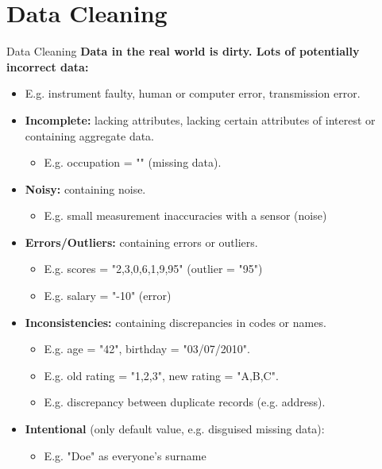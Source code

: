 \section{Data Cleaning}

\begin{frame}{Data Cleaning}
	\textbf{Data in the real world is {\color{airforceblue}dirty}. Lots of
		potentially incorrect data:}
	\begin{itemize}
		\item E.g. instrument faulty, human or computer error, transmission
		      error.
		\item \textbf{\color{airforceblue}Incomplete:} lacking attributes,
		      lacking certain attributes of interest or containing aggregate data.
		      \begin{itemize}
			      \item E.g. occupation = "" (missing data).
		      \end{itemize}
		\item \textbf{\color{airforceblue}Noisy:} containing noise.
		      \begin{itemize}
			      \item E.g. small measurement inaccuracies with a sensor
			            (noise)
		      \end{itemize}
		\item \textbf{\color{airforceblue}Errors/Outliers:} containing errors
		      or outliers.
		      \begin{itemize}
			      \item E.g. scores = "2,3,0,6,1,9,95" (outlier = "95")
			      \item E.g. salary = "-10" (error)
		      \end{itemize}
		\item \textbf{\color{airforceblue}Inconsistencies:} containing
		      discrepancies in codes or names.
		      \begin{itemize}
			      \item E.g. age = "42", birthday = "03/07/2010".
			      \item E.g. old rating = "1,2,3", new rating = "A,B,C".
			      \item E.g. discrepancy between duplicate records (e.g. address).
		      \end{itemize}
		\item \textbf{\color{airforceblue}Intentional} (only default value,
		      e.g. disguised missing data):
		      \begin{itemize}
			      \item E.g. "Doe" as everyone's surname
		      \end{itemize}
	\end{itemize}
\end{frame}


